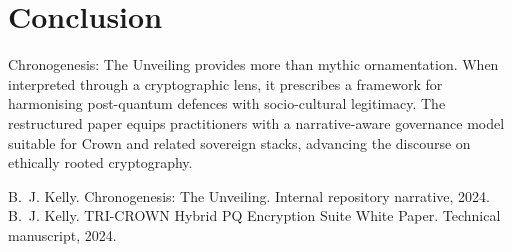 \documentclass[submission]{iacrtrans}
\begin{document}
\section{Conclusion}
Chronogenesis: The Unveiling provides more than mythic ornamentation.
When interpreted through a cryptographic lens, it prescribes a framework for harmonising post-quantum defences with socio-cultural legitimacy.
The restructured paper equips practitioners with a narrative-aware governance model suitable for Crown\,\textOmega\,and related sovereign stacks, advancing the discourse on ethically rooted cryptography.

\begin{thebibliography}{9}
B.~J. Kelly.
\newblock Chronogenesis: The Unveiling.
\newblock Internal repository narrative, 2024.
B.~J. Kelly.
\newblock TRI-CROWN Hybrid PQ Encryption Suite White Paper.
\newblock Technical manuscript, 2024.
\end{thebibliography}
\end{document}
